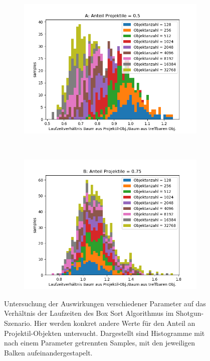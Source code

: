 \begin{figure}

	\begin{subfigure}[t]{0.55\textwidth}
		\centering
		\includegraphics[width=1\textwidth]{./res/boxsortChoice-shotgun-F.png}
		
		\label{fig:boxsortChoice-shotgun-F}
	\end{subfigure}
~
	\begin{subfigure}[t]{0.55\textwidth}
		\centering
		\includegraphics[width=1\textwidth]{./res/boxsortChoice-shotgun-G.png}

		\label{fig:boxsortChoice-shotgun-G}
	\end{subfigure}

	\caption{Untersuchung der Auswirkungen verschiedener Parameter auf das Verhältnis der Laufzeiten des Box Sort Algorithmus im Shotgun-Szenario. Hier werden konkret andere Werte für den Anteil an Projektil-Objekten untersucht. Dargestellt sind Histogramme mit nach einem Parameter getrennten Samples, mit den jeweiligen Balken aufeinandergestapelt.}
	\label{fig:boxsortChoice-shotgun2}
\end{figure}

